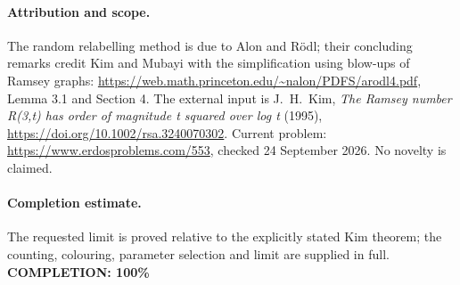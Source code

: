\paragraph{Attribution and scope.}
The random relabelling method is due to Alon and R\"odl;
their concluding remarks credit Kim and Mubayi with the simplification
using blow-ups of Ramsey graphs:
\url{https://web.math.princeton.edu/~nalon/PDFS/arodl4.pdf},
Lemma 3.1 and Section 4.
The external input is J.~H.~Kim, \emph{The Ramsey number R(3,t) has
order of magnitude t squared over log t} (1995),
\url{https://doi.org/10.1002/rsa.3240070302}.
Current problem: \url{https://www.erdosproblems.com/553},
checked 24 September 2026. No novelty is claimed.

\paragraph{Completion estimate.}
The requested limit is proved relative to the explicitly stated Kim theorem;
the counting, colouring, parameter selection and limit are supplied in full.
\textbf{COMPLETION: 100\%}
